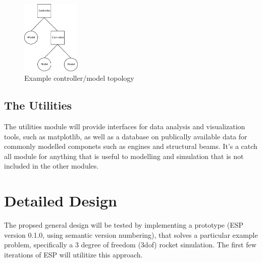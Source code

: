 \documentclass{article}
\begin{document}
\begin{figure}[h]
\begin{center}
\leavevmode
\includegraphics[width=0.25\textwidth]{example_controller_layout.pdf}
\end{center}
\caption{Example controller/model topology}
\label{example_controller_model_topology}
\end{figure}

\subsection{The Utilities}
The utilities module will provide interfaces for data analysis and visualization tools, such as matplotlib, as well as a database on publically available data for commonly modelled componets such as engines and structural beams. It's a catch all module for anything that is useful to modelling and simulation that is not included in the other modules.

\section{Detailed Design}
The propsed general design will be tested by implementing a prototype (ESP version 0.1.0, using semantic version numbering), that solves a particular example problem, specifically a 3 degree of freedom (3dof) rocket simulation. The first few iterations of ESP will utilitize this approach.
\end{document}
